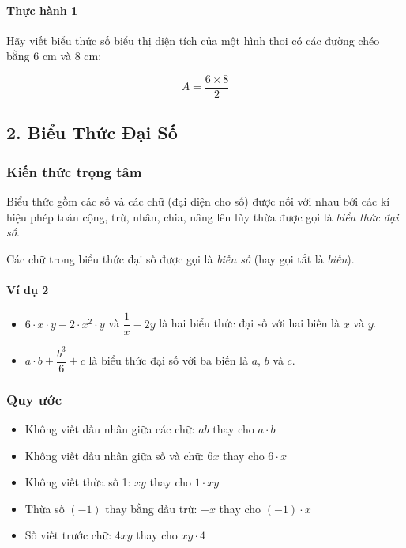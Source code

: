 \documentclass[
]{article}
\providecommand{\tightlist}{%
  \setlength{\itemsep}{0pt}\setlength{\parskip}{0pt}}
\begin{document}
\paragraph{Thực hành 1}\label{thux1ef1c-huxe0nh-1}

Hãy viết biểu thức số biểu thị diện tích của một hình thoi có các đường
chéo bằng 6 cm và 8 cm:

\[A = \frac{6 \times 8}{2}\]

\subsection{2. Biểu Thức Đại
Số}\label{biux1ec3u-thux1ee9c-ux111ux1ea1i-sux1ed1}

\subsubsection{Kiến thức trọng
tâm}\label{kiux1ebfn-thux1ee9c-trux1ecdng-tuxe2m}

Biểu thức gồm các số và các chữ (đại diện cho số) được nối với nhau bởi
các kí hiệu phép toán cộng, trừ, nhân, chia, nâng lên lũy thừa được gọi
là \emph{biểu thức đại số}.

Các chữ trong biểu thức đại số được gọi là \emph{biến số} (hay gọi tắt
là \emph{biến}).

\paragraph{Ví dụ 2}\label{vuxed-dux1ee5-2}

\begin{itemize}
\tightlist
\item
  \(6 \cdot x \cdot y - 2 \cdot x^2 \cdot y\) và \(\dfrac{1}{x} - 2y\)
  là hai biểu thức đại số với hai biến là \(x\) và \(y\).
\item
  \(a \cdot b + \dfrac{b^3}{6} + c\) là biểu thức đại số với ba biến là
  \(a\), \(b\) và \(c\).
\end{itemize}

\subsubsection{Quy ước}\label{quy-ux1b0ux1edbc}

\begin{itemize}
\tightlist
\item
  Không viết dấu nhân giữa các chữ: \(ab\) thay cho \(a \cdot b\)
\item
  Không viết dấu nhân giữa số và chữ: \(6x\) thay cho \(6 \cdot x\)
\item
  Không viết thừa số 1: \(xy\) thay cho \(1 \cdot xy\)
\item
  Thừa số \((-1)\) thay bằng dấu trừ: \(-x\) thay cho \((-1) \cdot x\)
\item
  Số viết trước chữ: \(4xy\) thay cho \(xy \cdot 4\)
\end{itemize}
\end{document}
